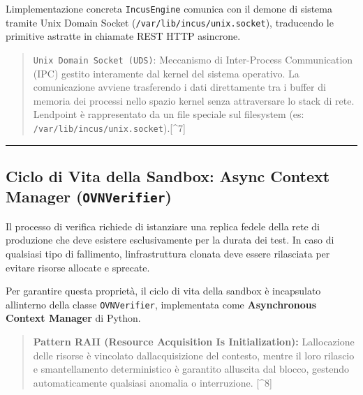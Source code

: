 L\textquotesingle implementazione concreta
\passthrough{\lstinline!IncusEngine!} comunica con il demone di sistema
tramite Unix Domain Socket
(\passthrough{\lstinline!/var/lib/incus/unix.socket!}), traducendo le
primitive astratte in chiamate REST HTTP asincrone.

\begin{quote}
\passthrough{\lstinline!Unix Domain Socket (UDS)!}: Meccanismo di
Inter-Process Communication (IPC) gestito interamente dal kernel del
sistema operativo. La comunicazione avviene trasferendo i dati
direttamente tra i buffer di memoria dei processi nello spazio kernel
senza attraversare lo stack di rete. L\textquotesingle endpoint è
rappresentato da un file speciale sul filesystem (es:
\passthrough{\lstinline!/var/lib/incus/unix.socket!}).{[}\^{}7{]}
\end{quote}

\begin{center}\rule{0.5\linewidth}{0.5pt}\end{center}

\subsection{\texorpdfstring{Ciclo di Vita della Sandbox: Async Context
Manager
(\texttt{OVNVerifier})}{Ciclo di Vita della Sandbox: Async Context Manager (OVNVerifier)}}\label{ciclo-di-vita-della-sandbox-async-context-manager-ovnverifier}

Il processo di verifica richiede di istanziare una replica fedele della
rete di produzione che deve esistere esclusivamente per la durata dei
test. In caso di qualsiasi tipo di fallimento,
l\textquotesingle infrastruttura clonata deve essere rilasciata per
evitare risorse allocate e sprecate.

Per garantire questa proprietà, il ciclo di vita della sandbox è
incapsulato all\textquotesingle interno della classe
\passthrough{\lstinline!OVNVerifier!}, implementata come
\textbf{Asynchronous Context Manager} di Python.

\begin{quote}
\textbf{Pattern RAII (Resource Acquisition Is Initialization):}
L\textquotesingle allocazione delle risorse è vincolato
dall\textquotesingle acquisizione del contesto, mentre il loro rilascio
e smantellamento deterministico è garantito all\textquotesingle uscita
dal blocco, gestendo automaticamente qualsiasi anomalia o interruzione.
{[}\^{}8{]}
\end{quote}

